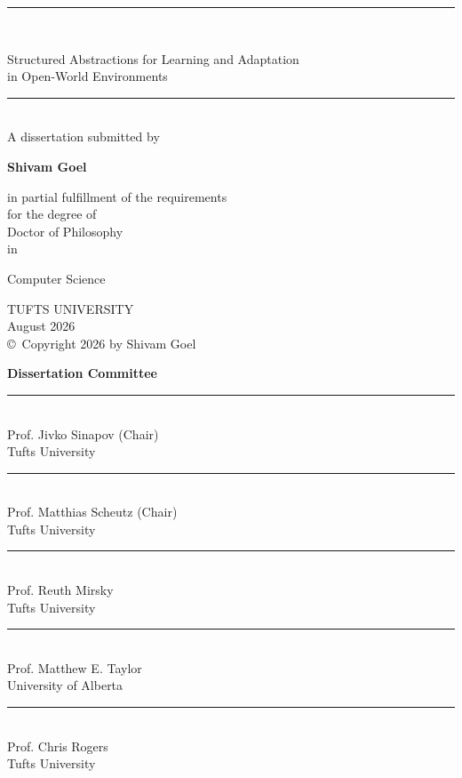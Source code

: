 \begin{titlepage}
\thispagestyle{empty}
\begin{center}
  \vspace*{0.5cm}
  \rule{\linewidth}{1.2pt}\\[0.45cm]
  {\huge Structured Abstractions for Learning and Adaptation\\
  in Open-World Environments\par}
  \vspace{0.35cm}
  \rule{\linewidth}{1.2pt}\\[0.65cm]

  A dissertation submitted by\\[0.45cm]
  {\Large\bfseries Shivam Goel\par}
  \vspace{0.65cm}

  in partial fulfillment of the requirements\\
  for the degree of\\[0.45cm]
  {\Large Doctor of Philosophy}\\[0.45cm]
  in\\[0.45cm]
  {\Large Computer Science\par}

  \vfill
  TUFTS UNIVERSITY\\[0.45cm]
  August 2026\\[1.2cm]
  \copyright\ Copyright 2026 by Shivam Goel
\end{center}
\end{titlepage}

\clearpage
\thispagestyle{plain}
\begin{center}
  \vspace*{0.75cm}
  {\Large\bfseries Dissertation Committee\par}
  \vspace{1.2cm}

  \rule{8cm}{0.4pt}\\
  Prof. Jivko Sinapov (Chair)\\
  Tufts University\\[0.8cm]

  \rule{8cm}{0.4pt}\\
  Prof. Matthias Scheutz (Chair)\\
  Tufts University\\[0.8cm]

  \rule{8cm}{0.4pt}\\
  Prof. Reuth Mirsky\\
  Tufts University\\[0.8cm]

  \rule{8cm}{0.4pt}\\
  Prof. Matthew E. Taylor\\
  University of Alberta\\[0.8cm]

  \rule{8cm}{0.4pt}\\
  Prof. Chris Rogers\\
  Tufts University
\end{center}
\clearpage

